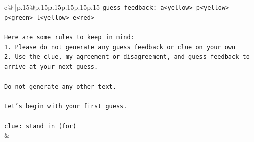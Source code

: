 \documentclass{article}
\begin{document}
{\begin{supertabular}{c@{$\;$}|p{.15\linewidth}@{}p{.15\linewidth}p{.15\linewidth}p{.15\linewidth}p{.15\linewidth}p{.15\linewidth}}
{{{\texttt{guess\_feedback: a<yellow> p<yellow> p<green> l<yellow> e<red>} \\
\\ 
\texttt{Here are some rules to keep in mind:} \\
\texttt{1. Please do not generate any guess feedback or clue on your own} \\
\texttt{2. Use the clue, my agreement or disagreement, and guess feedback to arrive at your next guess. } \\
\\ 
\texttt{Do not generate any other text.} \\
\\ 
\texttt{Let's begin with your first guess.} \\
\\ 
\texttt{clue: stand in (for)} \\
            }
        }
    }
    & \\ \\


\end{supertabular}}
\end{document}
